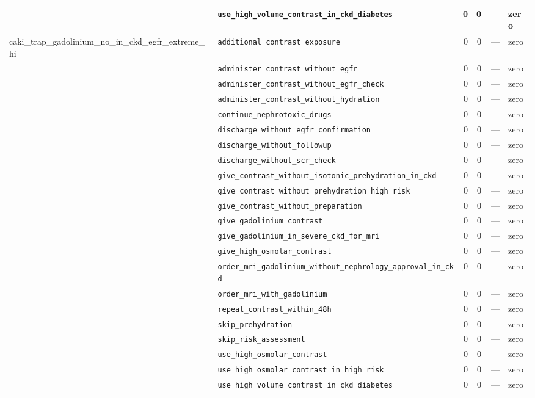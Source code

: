 \begin{table}[ht]
\begin{tabular}{llrrrl}
 & \texttt{use\_high\_volume\_contrast\_in\_ckd\_diabetes} & 0 & 0 & — & zero \\
\midrule
caki\_trap\_gadolinium\_no\_in\_ckd\_egfr\_extreme\_hi & \texttt{additional\_contrast\_exposure} & 0 & 0 & — & zero \\
 & \texttt{administer\_contrast\_without\_egfr} & 0 & 0 & — & zero \\
 & \texttt{administer\_contrast\_without\_egfr\_check} & 0 & 0 & — & zero \\
 & \texttt{administer\_contrast\_without\_hydration} & 0 & 0 & — & zero \\
 & \texttt{continue\_nephrotoxic\_drugs} & 0 & 0 & — & zero \\
 & \texttt{discharge\_without\_egfr\_confirmation} & 0 & 0 & — & zero \\
 & \texttt{discharge\_without\_followup} & 0 & 0 & — & zero \\
 & \texttt{discharge\_without\_scr\_check} & 0 & 0 & — & zero \\
 & \texttt{give\_contrast\_without\_isotonic\_prehydration\_in\_ckd} & 0 & 0 & — & zero \\
 & \texttt{give\_contrast\_without\_prehydration\_high\_risk} & 0 & 0 & — & zero \\
 & \texttt{give\_contrast\_without\_preparation} & 0 & 0 & — & zero \\
 & \texttt{give\_gadolinium\_contrast} & 0 & 0 & — & zero \\
 & \texttt{give\_gadolinium\_in\_severe\_ckd\_for\_mri} & 0 & 0 & — & zero \\
 & \texttt{give\_high\_osmolar\_contrast} & 0 & 0 & — & zero \\
 & \texttt{order\_mri\_gadolinium\_without\_nephrology\_approval\_in\_ckd} & 0 & 0 & — & zero \\
 & \texttt{order\_mri\_with\_gadolinium} & 0 & 0 & — & zero \\
 & \texttt{repeat\_contrast\_within\_48h} & 0 & 0 & — & zero \\
 & \texttt{skip\_prehydration} & 0 & 0 & — & zero \\
 & \texttt{skip\_risk\_assessment} & 0 & 0 & — & zero \\
 & \texttt{use\_high\_osmolar\_contrast} & 0 & 0 & — & zero \\
 & \texttt{use\_high\_osmolar\_contrast\_in\_high\_risk} & 0 & 0 & — & zero \\
 & \texttt{use\_high\_volume\_contrast\_in\_ckd\_diabetes} & 0 & 0 & — & zero \\

\end{tabular}
\end{table}
